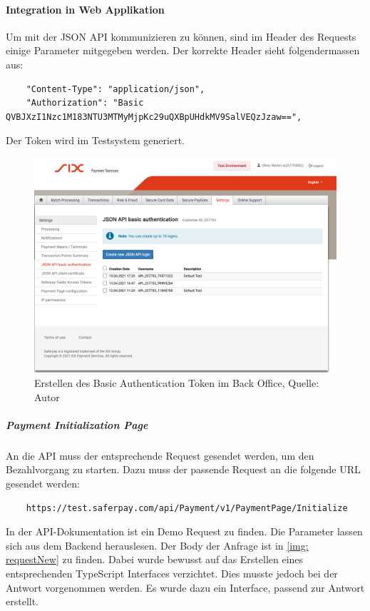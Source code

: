  \paragraph{Integration in Web Applikation}
 Um mit der JSON API kommunizieren zu können, sind im Header des Requests einige Parameter mitgegeben werden. Der korrekte Header sieht folgendermassen aus: 
 \begin{verbatim}
	"Content-Type": "application/json", 
	"Authorization": "Basic QVBJXzI1Nzc1M183NTU3MTMyMjpKc29uQXBpUHdkMV9SalVEQzJzaw==",
 \end{verbatim}
Der Token wird im Testsystem generiert. 
\begin{figure}[H]
	\centering
	\includegraphics[width=1\textwidth]{images/basicAuth.PNG}
	\caption[Erstellen des Basic Authentication Token im Back Office]{Erstellen des Basic Authentication Token im Back Office, Quelle: Autor}
	\label{img: basicAuth}
\end{figure} 
 \subparagraph{Payment Initialization Page}
 An die API muss der entsprechende Request gesendet werden, um den Bezahlvorgang zu starten. Dazu muss der passende Request an die folgende URL gesendet werden: 
 \begin{verbatim}
 	https://test.saferpay.com/api/Payment/v1/PaymentPage/Initialize
 \end{verbatim}
In der API-Dokumentation ist ein Demo Request zu finden. Die Parameter lassen sich aus dem Backend herauslesen. 
Der Body der Anfrage ist in \ref{img: requestNew} zu finden. 
Dabei wurde bewusst auf das Erstellen eines entsprechenden TypeScript Interfaces verzichtet. 
Dies musste jedoch bei der Antwort vorgenommen werden. 
Es wurde dazu ein Interface, passend zur Antwort erstellt.\\

